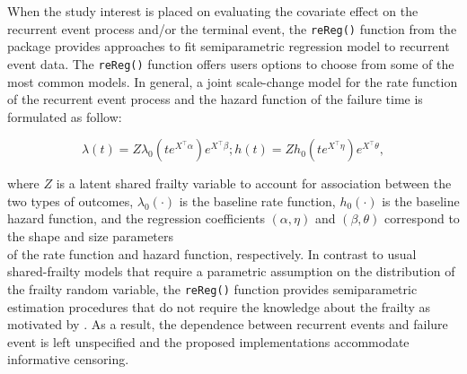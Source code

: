 When the study interest is placed on evaluating the covariate effect on
the recurrent event process and/or the terminal event, the
\texttt{reReg()} function from the  package provides
approaches to fit semiparametric regression model to recurrent event
data. The \texttt{reReg()} function offers users options to choose from
some of the most common models. In general, a joint scale-change model
for the rate function of the recurrent event process and the hazard
function of the failure time is formulated as follow:

\begin{equation}
\lambda(t) = Z \lambda_0(te^{X^\top\alpha})e^{X^\top\beta};
h(t) = Z h_0(te^{X^\top\eta})e^{X^\top\theta},
\label{general}
\end{equation}

where \(Z\) is a latent shared frailty variable to account for
association between the two types of outcomes, \(\lambda_0(\cdot)\) is
the baseline rate function, \(h_0(\cdot)\) is the baseline hazard
function, and the regression coefficients \((\alpha, \eta)\) and
\((\beta, \theta)\) correspond to the shape and size parameters\\
of the rate function and hazard function, respectively. In contrast to
usual shared-frailty models that require a parametric assumption on the
distribution of the frailty random variable, the \texttt{reReg()}
function provides semiparametric estimation procedures that do not
require the knowledge about the frailty as motivated by
\citet{wang2001analyzing}. As a result, the dependence between recurrent
events and failure event is left unspecified and the proposed
implementations accommodate informative censoring.

